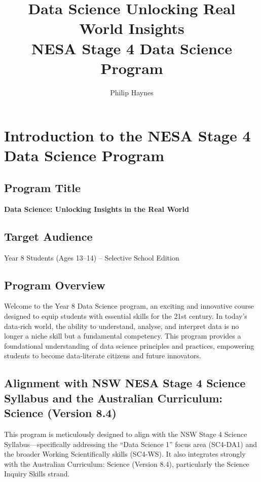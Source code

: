 \documentclass{tufte-book}
\title{Data Science \linebreak Unlocking Real World Insights \\[1ex]
\large  NESA Stage 4 Data Science Program}
\author{Philip Haynes}
\date{\monthyear}
\begin{document}
\frontmatter

\maketitle

\tableofcontents

\listoffigures
\listoftables

\mainmatter

\chapter{Introduction to the NESA Stage 4 Data Science Program}
\section*{Program Title}
\textbf{Data Science: Unlocking Insights in the Real World}

\section*{Target Audience}
Year 8 Students (Ages 13--14) -- Selective School Edition

\section*{Program Overview}
Welcome to the Year 8 Data Science program, an exciting and innovative course designed to equip students with essential skills for the 21st century. In today's data‐rich world, the ability to understand, analyse, and interpret data is no longer a niche skill but a fundamental competency. This program provides a foundational understanding of data science principles and practices, empowering students to become data‐literate citizens and future innovators.

\section*{Alignment with NSW NESA Stage 4 Science Syllabus and the Australian Curriculum: Science (Version 8.4)}
This program is meticulously designed to align with the NSW Stage 4 Science Syllabus—specifically addressing the ``Data Science 1'' focus area (SC4-DA1) and the broader Working Scientifically skills (SC4-WS). It also integrates strongly with the Australian Curriculum: Science (Version 8.4), particularly the Science Inquiry Skills strand.
\end{document}
